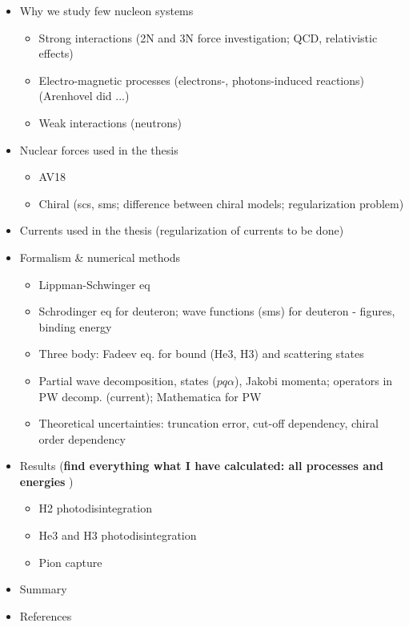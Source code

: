\begin{itemize}
    \item Why we study few nucleon systems
    \begin{itemize}
        \item Strong interactions (2N and 3N force investigation; QCD, relativistic effects)
        \item Electro-magnetic processes (electrons-, photons-induced reactions) (Arenhovel did ...)
        \item Weak interactions (neutrons)
    \end{itemize}

    \item Nuclear forces used in the thesis
    \begin{itemize}
        \item AV18
        \item Chiral (scs, sms; difference between chiral models; regularization problem)
    \end{itemize}

    \item Currents used in the thesis (regularization of currents to be done)
    
    \item Formalism \& numerical methods
    \begin{itemize}
        \item Lippman-Schwinger eq
        \item Schrodinger eq for deuteron; wave functions (sms) for deuteron - figures, binding energy
        \item Three body: Fadeev eq. for bound (He3, H3) and scattering states
        \item Partial wave decomposition, states ($pq\alpha$), Jakobi momenta;
        operators in PW decomp. (current); Mathematica for PW
        \item Theoretical uncertainties: truncation error, cut-off dependency, chiral order dependency
    \end{itemize}

    \item Results (\textbf{find everything what I have calculated: all processes and energies} )
    \begin{itemize}
        \item H2 photodisintegration
        \item He3 and H3 photodisintegration
        \item Pion capture
    \end{itemize}

    \item Summary
    
    \item References
\end{itemize}